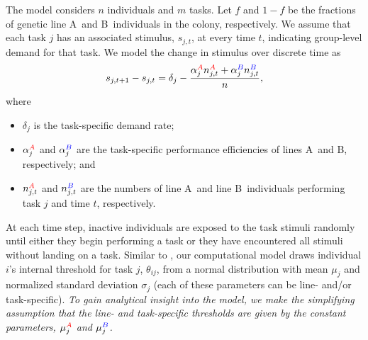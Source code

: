 \documentclass[10pt]{article}
\theoremstyle{remark}
\newcommand{\A}{{\color{red}A}}
\newcommand{\B}{{\color{blue}B}}
\begin{document}
The model considers $n$ individuals and $m$ tasks. 
{\color{orange}Let $f$ and $1-f$ be the fractions of genetic line \A\ and \B\ individuals in the colony, respectively.}
We assume that each task $j$ has an associated stimulus, $s_{j,t}$, at every time $t$, indicating group-level demand for that task. We model the change in stimulus over discrete time as
\begin{equation}
    s_{j,t+1} - s_{j,t} = \delta_j - \frac{\alpha_j^{\A} n_{j,t}^{\A} + \alpha_j^{\B} n_{j,t}^{\B} }{n}, \label{eq:stim}
\end{equation}
where 
\begin{itemize}
    \item $\delta_j$ is the task-specific demand rate;
    \item $\alpha_j^{\A}$ and $\alpha_j^{\B}$ are the task-specific performance efficiencies of lines \A\ and \B, respectively; and
    \item $n_{j,t}^{\A}$ and $n_{j,t}^{\B}$ are the numbers of line \A\ and line \B\ individuals performing task $j$ and time $t$, respectively.
\end{itemize}

At each time step, inactive individuals are exposed to the task stimuli randomly until either they begin performing a task or they have encountered all stimuli without landing on a task. Similar to \cite{ulrich18}, our computational model draws individual $i$'s internal threshold for task $j$, $\theta_{ij}$, from a normal distribution with mean $\mu_j$ and normalized standard deviation $\sigma_j$ (each of these parameters can be line- and/or task-specific). \textit{To gain analytical insight into the model, we make the simplifying assumption that the line- and task-specific thresholds are given by the constant parameters, $\mu_j^{\A}$ and $\mu_j^{\B}$.}
\end{document}
